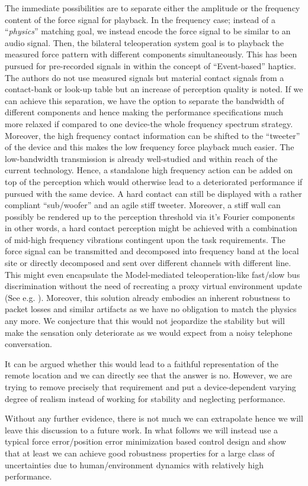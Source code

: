 The immediate possibilities are to separate either the amplitude or the frequency content of the force signal for playback. In the frequency
case; instead of a \enquote{\emph{physics}} matching goal, we instead encode the force signal to be similar to an audio signal. Then, the 
bilateral teleoperation system goal is to playback the measured force pattern with different components simultaneously. This has been pursued for 
pre-recorded signals in \cite{kuchenbecker} within the concept of \enquote{Event-based} haptics. The authors do not use measured 
signals but material contact signals from a contact-bank or look-up table but an increase of perception quality is noted. If we can achieve this separation, 
we have the option to separate the bandwidth of different components and hence making the performance specifications much more 
relaxed if compared to one device-the whole frequency spectrum strategy. Moreover, the high frequency contact information can be shifted 
to the \enquote{tweeter} of the device and this makes the low frequency force playback much easier. The low-bandwidth transmission is already 
well-studied and within reach of the current technology. Hence, a standalone high frequency action can be added on top of the perception 
which would otherwise lead to a deteriorated performance if pursued with the same device. A hard contact can still be displayed with a 
rather compliant \enquote{sub/woofer} and an agile stiff tweeter. Moreover, a stiff wall can possibly be rendered up to the perception 
threshold via it's Fourier components in other words, a hard contact perception might be achieved with a combination of mid-high frequency
vibrations contingent upon the task requirements. The force signal can be transmitted and decomposed into frequency band at the local site
or directly decomposed and sent over different channels with different line. This might even encapsulate the Model-mediated teleoperation-like
fast/slow bus discrimination without the need of recreating a proxy virtual environment update (See e.g. \cite{mitraniemeyer}). Moreover, this 
solution already embodies an inherent robustness to packet losses and similar artifacts as we have no obligation to match the physics any more. 
We conjecture that this would not jeopardize the stability but will make the sensation only deteriorate as we would expect from a noisy telephone 
conversation. 


It can be argued whether this would lead to a faithful representation of the remote location and we can directly see that the answer is no. 
However, we are trying to remove precisely that requirement and put a device-dependent varying degree of realism instead of working for 
stability and neglecting performance. 


Without any further evidence, there is not much we can extrapolate hence we will leave this discussion to a future work. In what follows
we will instead use a typical force error/position error minimization based control design and show that at least we can achieve good 
robustness properties for a large class of uncertainties due to human/environment dynamics with relatively high performance. 


